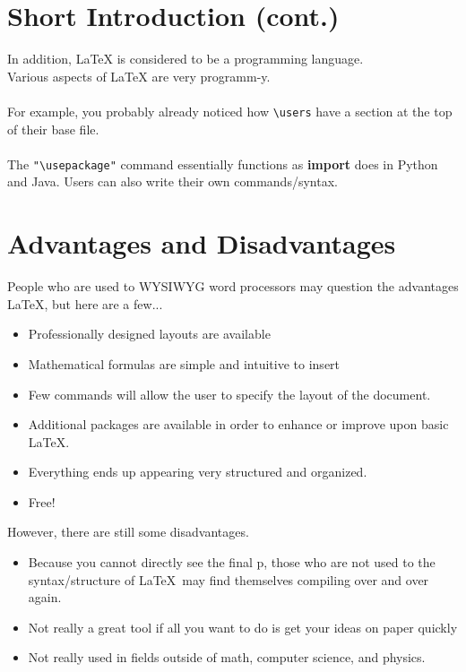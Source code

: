 \documentclass[a4paper,11pt]{report}
\begin{document}
\newpage
\section{Short Introduction (cont.)}
\Large
In addition, LaTeX is considered to be a programming language. \\
Various aspects of LaTeX are very programm-y. \\\\
For example, you probably already noticed
how \verb|\users| have a section at the top of their base file. \\\\
The \verb|"\usepackage"| command essentially functions as \textbf{import} does
in Python and Java. Users can also write their own commands/syntax.


\newpage
\section{Advantages and Disadvantages}

People who are used to WYSIWYG word processors may question the advantages \LaTeX, but here are a few...

\begin{itemize}
  \item Professionally designed layouts are available
  \item Mathematical formulas are simple and intuitive to insert
  \item Few commands will allow the user to specify the layout of the document.
  \item Additional packages are available in order to enhance or improve upon basic \LaTeX.
  \item Everything ends up appearing very structured and organized.
  \item Free!
\end{itemize}

However, there are still some disadvantages.

\begin{itemize}
    \item Because you cannot directly see the final p, those who are not used to the syntax/structure of \LaTeX\ may find themselves compiling over and over again.
    \item Not really a great tool if all you want to do is get your ideas on paper quickly
    \item Not really used in fields outside of math, computer science, and physics.
\end{itemize}
\end{document}
